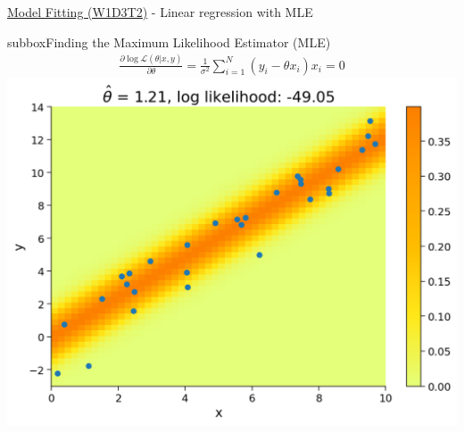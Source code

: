 \begin{textbox}{\href{https://compneuro.neuromatch.io/tutorials/W1D3_ModelFitting/student/W1D3_Tutorial2.html}{Model Fitting (W1D3T2)} -  Linear regression with MLE}
\begin{subbox}{subbox}{Finding the Maximum Likelihood Estimator (MLE)}
\begin{align}
\frac{\partial\operatorname{log}\mathcal{L}(\theta|x,y)}{\partial\theta}=\frac{1}{\sigma^2}\sum_{i=1}^N(y_i-\theta x_i)x_i = 0
\end{align}
\centering
\includegraphics[scale=0.2]{Figures/ModelFitting/MFFigure2.png}
\end{subbox}
\end{textbox}
